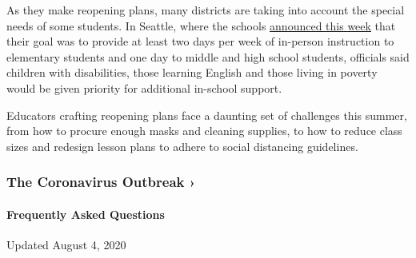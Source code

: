 As they make reopening plans, many districts are taking into account the
special needs of some students. In Seattle, where the schools
\href{https://www.seattleschools.org/district/calendars/news/what_s_new/coronavirus_update}{announced
this week} that their goal was to provide at least two days per week of
in-person instruction to elementary students and one day to middle and
high school students, officials said children with disabilities, those
learning English and those living in poverty would be given priority for
additional in-school support.

Educators crafting reopening plans face a daunting set of challenges
this summer, from how to procure enough masks and cleaning supplies, to
how to reduce class sizes and redesign lesson plans to adhere to social
distancing guidelines.

\href{https://www.nytimes.com/news-event/coronavirus?action=click\&pgtype=Article\&state=default\&region=MAIN_CONTENT_3\&context=storylines_faq}{}

\hypertarget{the-coronavirus-outbreak-}{%
\subsubsection{The Coronavirus Outbreak
›}\label{the-coronavirus-outbreak-}}

\hypertarget{frequently-asked-questions}{%
\paragraph{Frequently Asked
Questions}\label{frequently-asked-questions}}

Updated August 4, 2020


